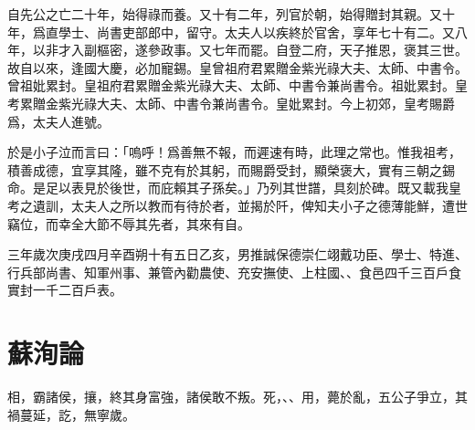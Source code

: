自先公之亡二十年，始得祿而養。又十有二年，列官於朝，始得贈封其親。又十年，爲直學士、尚書吏部郎中，留守。太夫人以疾終於官舍，享年七十有二。又八年，以非才入副樞密，遂參政事。又七年而罷。自登二府，天子推恩，褒其三世。故自以來，逢國大慶，必加寵錫。皇曾祖府君累贈金紫光祿大夫、太師、中書令。曾祖妣累封。皇祖府君累贈金紫光祿大夫、太師、中書令兼尚書令。祖妣累封。皇考累贈金紫光祿大夫、太師、中書令兼尚書令。皇妣累封。今上初郊，皇考賜爵爲，太夫人進號。

於是小子泣而言曰：「嗚呼！爲善無不報，而遲速有時，此理之常也。惟我祖考，積善成德，宜享其隆，雖不克有於其躬，而賜爵受封，顯榮褒大，實有三朝之錫命。是足以表見於後世，而庇賴其子孫矣。」乃列其世譜，具刻於碑。既又載我皇考之遺訓，太夫人之所以教而有待於者，並揭於阡，俾知夫小子之德薄能鮮，遭世竊位，而幸全大節不辱其先者，其來有自。

三年歲次庚戌四月辛酉朔十有五日乙亥，男推誠保德崇仁翊戴功臣、學士、特進、行兵部尚書、知軍州事、兼管內勸農使、充安撫使、上柱國、、食邑四千三百戶食實封一千二百戶表。
\vspace{-0.5zw}
\theendnotes

\section[管仲論\quad{\small 蘇洵}]{{\normalsize 蘇洵}\quad{}論}
相，霸諸侯，攘，終其身富強，諸侯敢不叛。死，、、用，薨於亂，五公子爭立，其禍蔓延，訖，無寧歲。

